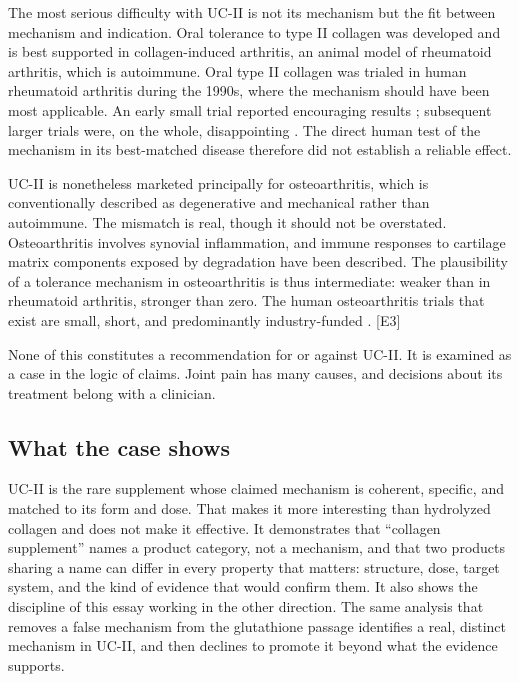 \documentclass[11pt,a4paper]{article}
\theoremstyle{plain}
\theoremstyle{definition}
\theoremstyle{remark}
\newcommand{\tier}[1]{\textup{\textsc{[#1]}}}
\newcommand{\Ethree}{\tier{E3}}
\begin{document}
The most serious difficulty with UC-II is not its mechanism but the fit between mechanism and indication. Oral tolerance to type II collagen was developed and is best supported in collagen-induced arthritis, an animal model of rheumatoid arthritis, which is autoimmune. Oral type II collagen was trialed in human rheumatoid arthritis during the 1990s, where the mechanism should have been most applicable. An early small trial reported encouraging results \cite{trentham1993}; subsequent larger trials were, on the whole, disappointing \cite{barnett1998}. The direct human test of the mechanism in its best-matched disease therefore did not establish a reliable effect.

UC-II is nonetheless marketed principally for osteoarthritis, which is conventionally described as degenerative and mechanical rather than autoimmune. The mismatch is real, though it should not be overstated. Osteoarthritis involves synovial inflammation, and immune responses to cartilage matrix components exposed by degradation have been described. The plausibility of a tolerance mechanism in osteoarthritis is thus intermediate: weaker than in rheumatoid arthritis, stronger than zero. The human osteoarthritis trials that exist are small, short, and predominantly industry-funded \cite{lugo2016}. \Ethree

\begin{caution}
None of this constitutes a recommendation for or against UC-II. It is examined as a case in the logic of claims. Joint pain has many causes, and decisions about its treatment belong with a clinician.
\end{caution}

\subsection{What the case shows}

UC-II is the rare supplement whose claimed mechanism is coherent, specific, and matched to its form and dose. That makes it more interesting than hydrolyzed collagen and does not make it effective. It demonstrates that ``collagen supplement'' names a product category, not a mechanism, and that two products sharing a name can differ in every property that matters: structure, dose, target system, and the kind of evidence that would confirm them. It also shows the discipline of this essay working in the other direction. The same analysis that removes a false mechanism from the glutathione passage identifies a real, distinct mechanism in UC-II, and then declines to promote it beyond what the evidence supports.
\end{document}
